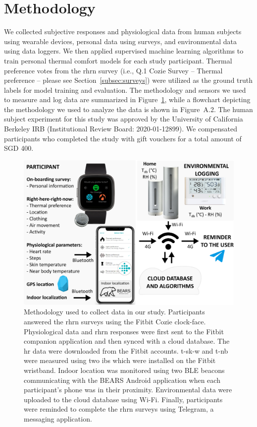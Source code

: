 \section{Methodology}\label{sec:methodology}
We collected subjective responses and physiological data from human subjects using wearable devices, personal data using surveys, and environmental data using data loggers.
We then applied supervised machine learning algorithms to train personal thermal comfort models for each study participant.
Thermal preference votes from the \ac{rhrn} survey (i.e., Q.1 Cozie Survey -- Thermal preference -- please see Section~\ref{subsec:surveys}) were utilized as the ground truth labels for model training and evaluation.
The methodology and sensors we used to measure and log data are summarized in Figure~\ref{fig:study_methodolgy}, while a flowchart depicting the methodology we used to analyze the data is shown in Figure~A.2.
The human subject experiment for this study was approved by the University of California Berkeley IRB (Institutional Review Board: 2020-01-12899).
We compensated participants who completed the study with gift vouchers for a total amount of SGD 400. 

\begin{figure}[thb!]
    \centering
    \includegraphics[width=\textwidth]{figures/figure_1}
    \caption{Methodology used to collect data in our study.
    Participants answered the \ac*{rhrn} surveys using the Fitbit Cozie clock-face.
    Physiological data and \ac*{rhrn} responses were first sent to the Fitbit companion application and then synced with a cloud database.
    The \ac*{hr} data were downloaded from the Fitbit accounts.
    \Ac*{t-sk-w} and \ac*{t-nb} were measured using two \glspl{ib} which were installed on the Fitbit wristband.
    Indoor location was monitored using two BLE beacons communicating with the BEARS Android application when each participant's phone was in their proximity.
    Environmental data were uploaded to the cloud database using Wi-Fi.
    Finally, participants were reminded to complete the \ac*{rhrn} surveys using Telegram, a messaging application.}
    \label{fig:study_methodolgy}
\end{figure}

